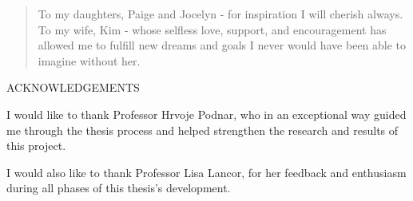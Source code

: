 \documentclass[12pt]{report}
\newenvironment{dedication}
	{\vspace{6ex}\begin{quotation}\begin{center}\begin{em}}
	{\par\end{em}\end{center}\end{quotation}}
\begin{document}
\begin{dedication}
\setcounter{page}{4}
\vspace*{\fill}
To my daughters, Paige and Jocelyn - for inspiration I will cherish always.
\linebreak\linebreak
To my wife, Kim - whose selfless love, support, and encouragement has allowed me to fulfill new dreams and goals I never would have been able to imagine without her.
\vspace*{\fill}
\end{dedication}


\newpage
\thispagestyle{plain}
\setcounter{page}{5}
\vspace*{0in}
\begin{center}
\MakeTextUppercase{\large{Acknowledgements}} \\
\end{center}

I would like to thank Professor Hrvoje Podnar, who  in an exceptional way guided me through the thesis process and helped strengthen the research and results of this project.

I would also like to thank Professor Lisa Lancor, for her feedback and enthusiasm during all phases of this thesis's development.

\newpage


\tableofcontents
\newpage
\listoffigures



\end{document}
